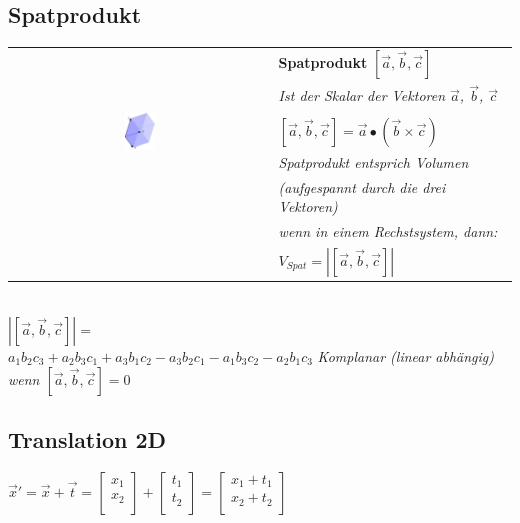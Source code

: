 \subsection{Spatprodukt}

\begin{tabular}{cl}
    \multirow{6}{*}{
        \includegraphics[width=0.12\textwidth]{assets/spatproduct.png}
    }
    & \textbf{Spatprodukt} $[\vec{a}, \vec{b}, \vec{c}]$ \\
    & \textit{Ist der Skalar der Vektoren $\vec{a}$, $\vec{b}$, $\vec{c}$} \\
    & \\
    & $[\vec{a}, \vec{b}, \vec{c}] = \vec{a} \bullet (\vec{b} \times \vec{c})$\\
    & \textit{Spatprodukt entsprich Volumen} \\
    & \textit{(aufgespannt durch die drei Vektoren)} \\
    & \textit{wenn in einem Rechstsystem, dann:} \\
    & $V_{Spat} = |[\vec{a}, \vec{b}, \vec{c}]|$

\end{tabular} \\

$|[\vec{a}, \vec{b}, \vec{c}]| = $ \\
$a_1 b_2 c_3 + a_2 b_3 c_1 + a_3 b_1 c_2 - a_3 b_2 c_1 - a_1 b_3 c_2 - a_2 b_1 c_3$
\textit{Komplanar (linear abhängig) wenn $[\vec{a}, \vec{b}, \vec{c}] = 0$}

\subsection{Translation 2D}

$\vec{x}' = \vec{x} + \vec{t} = \begin{bmatrix}
    x_1 \\
    x_2 \\
\end{bmatrix} + \begin{bmatrix}
    t_1 \\
    t_2 \\
\end{bmatrix} = \begin{bmatrix}
    x_1 + t_1 \\
    x_2 + t_2 \\
\end{bmatrix}$

